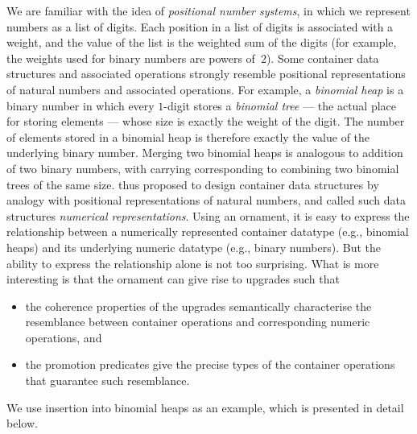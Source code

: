 We are familiar with the idea of \emph{positional number systems}, in which we represent numbers as a list of digits.
Each position in a list of digits is associated with a weight, and the value of the list is the weighted sum of the digits (for example, the weights used for binary numbers are powers of~$2$).
Some container data structures and associated operations strongly resemble positional representations of natural numbers and associated operations.
For example, a \emph{binomial heap} is a binary number in which every $1$-digit stores a \emph{binomial tree} --- the actual place for storing elements --- whose size is exactly the weight of the digit.
The number of elements stored in a binomial heap is therefore exactly the value of the underlying binary number.
Merging two binomial heaps is analogous to addition of two binary numbers, with carrying corresponding to combining two binomial trees of the same size.
\citeauthor{Okasaki-data-structures} thus proposed to design container data structures by analogy with positional representations of natural numbers, and called such data structures \emph{numerical representations}.
Using an ornament, it is easy to express the relationship between a numerically represented container datatype (e.g., binomial heaps) and its underlying numeric datatype (e.g., binary numbers).
But the ability to express the relationship alone is not too surprising.
What is more interesting is that the ornament can give rise to upgrades such that
\begin{itemize}
\item the coherence properties of the upgrades semantically characterise the resemblance between container operations and corresponding numeric operations, and
\item the promotion predicates give the precise types of the container operations that guarantee such resemblance.
\end{itemize}
We use insertion into binomial heaps as an example, which is presented in detail below.

